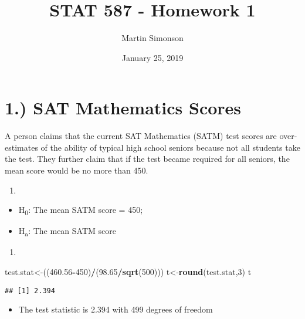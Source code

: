 \documentclass[]{article}
\title{STAT 587 - Homework 1}
\author{Martin Simonson}
\date{January 25, 2019}
\newenvironment{Shaded}{\begin{snugshade}}{\end{snugshade}}
\newcommand{\KeywordTok}[1]{\textcolor[rgb]{0.13,0.29,0.53}{\textbf{#1}}}
\newcommand{\DecValTok}[1]{\textcolor[rgb]{0.00,0.00,0.81}{#1}}
\newcommand{\FloatTok}[1]{\textcolor[rgb]{0.00,0.00,0.81}{#1}}
\newcommand{\OperatorTok}[1]{\textcolor[rgb]{0.81,0.36,0.00}{\textbf{#1}}}
\newcommand{\NormalTok}[1]{#1}
\providecommand{\tightlist}{%
  \setlength{\itemsep}{0pt}\setlength{\parskip}{0pt}}
\begin{document}
\maketitle

\section{1.) SAT Mathematics Scores}\label{sat-mathematics-scores}

A person claims that the current SAT Mathematics (SATM) test scores are
over-estimates of the ability of typical high school seniors because not
all students take the test. They further claim that if the test became
required for all seniors, the mean score would be no more than 450.

\begin{enumerate}
\def\labelenumi{(\alph{enumi})}
\item
\end{enumerate}

\begin{itemize}
\tightlist
\item
  H\textsubscript{0}: The mean SATM score = 450;
\item
  H\textsubscript{a}: The mean SATM score 
\end{itemize}

\begin{enumerate}
\def\labelenumi{(\alph{enumi})}
\setcounter{enumi}{1}
\item
\end{enumerate}

\begin{Shaded}
\begin{Highlighting}[]
\NormalTok{test.stat<-((}\FloatTok{460.56}\OperatorTok{-}\DecValTok{450}\NormalTok{)}\OperatorTok{/}\NormalTok{(}\FloatTok{98.65}\OperatorTok{/}\KeywordTok{sqrt}\NormalTok{(}\DecValTok{500}\NormalTok{)))}
\NormalTok{t<-}\KeywordTok{round}\NormalTok{(test.stat,}\DecValTok{3}\NormalTok{)}
\NormalTok{t}
\end{Highlighting}
\end{Shaded}

\begin{verbatim}
## [1] 2.394
\end{verbatim}

\begin{itemize}
\tightlist
\item
  The test statistic is 2.394 with 499 degrees of freedom
\end{itemize}
\end{document}
